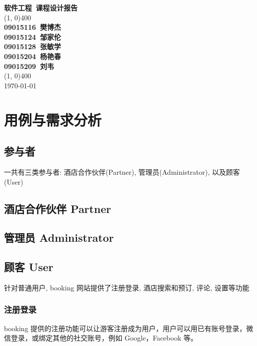 \documentclass[11pt]{article}
\begin{document}
\begin{titlepage}
\begin{center}

	\huge{\textbf{软件工程\ 课程设计报告}}\\

	\vfill
	\line(1, 0){400} \\ [1mm]
	\large{\textbf{09015116\ 樊博杰}} \\ [1mm]
	\large{\textbf{09015124\ 邹家伦}} \\ [1mm]
	\large{\textbf{09015128\ 张敏学}} \\ [1mm]
	\large{\textbf{09015204\ 杨艳春}} \\ [1mm]
	\large{\textbf{09015209\ 刘韦}} \\ [1mm]
	\line(1, 0){400} \\
	\large{\today}\\
\end{center}
\end{titlepage}

\tableofcontents
\thispagestyle{empty}
\clearpage


\setcounter{page}{1}
\section{用例与需求分析}
	\subsection{参与者}
	一共有三类参与者: 酒店合作伙伴(Partner), 管理员(Administrator), 以及顾客(User)
	\subsection{酒店合作伙伴 Partner}
		
	\subsection{管理员 Administrator}
		
	\subsection{顾客 User}
		针对普通用户, booking 网站提供了注册登录, 酒店搜索和预订, 评论, 设置等功能
		\subsubsection{注册登录}
		booking 提供的注册功能可以让游客注册成为用户，用户可以用已有账号登录，微信登录，或绑定其他的社交账号，例如 Google，Facebook 等。
\end{document}
